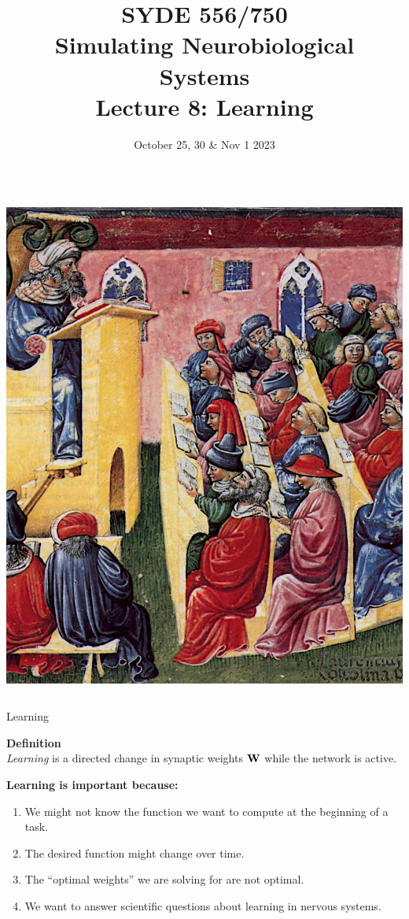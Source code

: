 \documentclass[handout,aspectratio=169]{beamer}
\date{October 25, 30 \& Nov 1 2023}
\title{SYDE 556/750 \\ Simulating Neurobiological Systems \\ Lecture 8: Learning}
\begin{document}
	
	\begin{frame}{}
		\vspace{0.5cm}
		\begin{columns}[c]
			\MakeTitle
			\includegraphics[width=\textwidth]{media/laurentius_de_voltolina_001_small.jpg}
		\end{columns}
	\end{frame}

  \begin{frame}{Learning}
    \begin{mdframed}
      \textbf{Definition}\\
      \emph{Learning} is a directed change in synaptic weights ${\mathbf{W}}$ while the network is active.
    \end{mdframed}  
    \vspace{.75cm}
    \textbf{Learning is important because:}
    \begin{enumerate}
      \item <2->We might not know the function we want to compute at the beginning of a task.
      \item <3->The desired function might change over time.
      \item <4->The \enquote{optimal weights} we are solving for are not optimal.
      \item <5->We want to answer scientific questions about learning in nervous systems.
    \end{enumerate}
	\end{frame}
\end{document}
